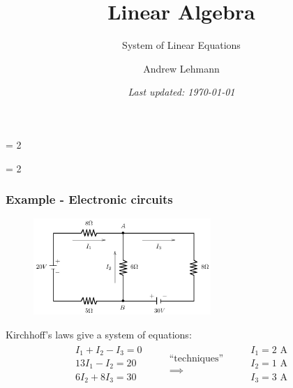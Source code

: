 \documentclass[usenames,dvipsnames,aspectratio=169,10pt]{beamer}
\def \SCHOOLVERSION {1} %
\numberwithin{equation}{section}
\begin{document}
\title{Linear Algebra}
\subtitle{System of Linear Equations}
\author{Andrew Lehmann}
\ifnum \SCHOOLVERSION = 2
\fi
\date{\textit{Last updated: \today}}

\ifnum \SCHOOLVERSION = 2
\fi

\begin{frame}
\titlepage
\end{frame}


\begin{frame}
\frametitle{Example - Electronic circuits}

\begin{figure}[H]
\includegraphics[width=0.6\textwidth]{example_circuit.png}
\end{figure}

Kirchhoff's laws give a system of equations: 
\begin{align*}
\begin{matrix}
I_1 + I_2 - I_3 = 0 \\
13I_1 - I_2 = 20 \\
6I_2 + 8I_3 = 30
\end{matrix}
\qquad
\begin{matrix}
\text{``techniques''} \\
\implies
\end{matrix}
\qquad
\begin{matrix}
I_1 =2\text{ A} \\
I_2 =1\text{ A} \\
I_3 =3\text{ A}
\end{matrix}
\end{align*}

\end{frame}
\end{document}
